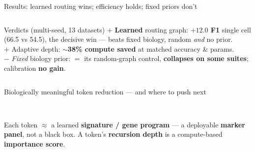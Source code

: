\documentclass[aspectratio=169,11pt]{beamer}
\newcommand{\good}[1]{\textcolor{accentA}{\textbf{#1}}}
\newcommand{\bad}[1]{\textcolor{neg}{\textbf{#1}}}
\newcommand{\comp}[1]{\textcolor{accentB}{\textbf{#1}}}
\begin{document}
\begin{frame}{Results: learned routing wins; efficiency holds; fixed priors don't}
\begin{columns}[T]
\begin{block}{\footnotesize Verdicts (multi-seed, 13 datasets)}
\scriptsize
\good{$+$} \good{Learned} routing graph: \good{$+12.0$ F1} single cell (66.5 vs 54.5), the decisive win --- beats fixed biology, random \emph{and} no prior.\\[2pt]
\comp{$+$} Adaptive depth: \comp{$\sim$38\% compute saved} at matched accuracy \& params.\\[2pt]
\bad{$-$} \emph{Fixed} biology prior: $=$ its random-graph control, \bad{collapses on some suites}; calibration \bad{no gain}.
\end{block}
\end{columns}
\end{frame}

\begin{frame}{Biologically meaningful token reduction --- and where to push next}
\begin{columns}[T]
\centering
{}
\vspace{1mm}\\
{\scriptsize Each token $\approx$ a learned \good{signature / gene program} --- a deployable \good{marker panel}, not a black box. A token's \good{recursion depth} is a compute-based \good{importance score}.}


\end{columns}
\end{frame}
\end{document}
